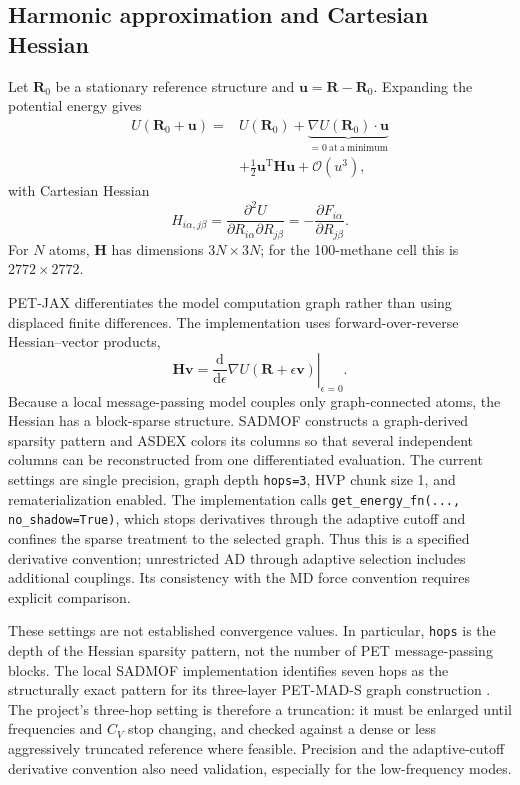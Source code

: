 \documentclass[10pt,a4paper,twocolumn]{article}
\newcommand{\cv}{\ensuremath{C_V}}
\begin{document}
\subsection{Harmonic approximation and Cartesian Hessian}

Let $\bm R_0$ be a stationary reference structure and
$\bm u=\bm R-\bm R_0$. Expanding the potential energy gives
\begin{equation}
  \begin{aligned}
  U(\bm R_0+\bm u)={}&U(\bm R_0)
  +\underbrace{\nabla U(\bm R_0)\cdot\bm u}
       _{=0\ \mathrm{at\ a\ minimum}}
  \\
  &+\frac{1}{2}\bm u^{\mathrm T}\bm H\bm u
  +\mathcal O(u^3),
  \end{aligned}
  \label{eq:taylor}
\end{equation}
with Cartesian Hessian
\begin{equation}
  H_{i\alpha,j\beta}
  =\frac{\partial^2 U}{\partial R_{i\alpha}\partial R_{j\beta}}
  =-\frac{\partial F_{i\alpha}}{\partial R_{j\beta}}.
  \label{eq:hessian}
\end{equation}
For $N$ atoms, $\bm H$ has dimensions $3N\times3N$; for the 100-methane cell
this is $2772\times2772$.

PET-JAX differentiates the model computation graph rather than using displaced
finite differences. The implementation uses forward-over-reverse
Hessian--vector products,
\begin{equation}
  \bm H\bm v=
  \left.\frac{\mathrm d}{\mathrm d\epsilon}
  \nabla U(\bm R+\epsilon\bm v)\right|_{\epsilon=0}.
\end{equation}
Because a local message-passing model couples only graph-connected atoms, the
Hessian has a block-sparse structure. SADMOF \cite{sadMof} constructs a
graph-derived sparsity pattern and ASDEX colors its columns so that several independent
columns can be reconstructed from one differentiated evaluation. The current
settings are single precision, graph depth \texttt{hops=3}, HVP chunk size 1,
and rematerialization enabled. The implementation calls
\texttt{get\_energy\_fn(..., no\_shadow=True)}, which stops derivatives
through the adaptive cutoff and confines the sparse treatment to the selected
graph. Thus this is a specified derivative convention; unrestricted AD
through adaptive selection includes additional couplings. Its consistency
with the MD force convention requires explicit comparison.

These settings are not established convergence values. In particular,
\texttt{hops} is the depth of the Hessian sparsity pattern, not the number of
PET message-passing blocks. The local SADMOF implementation identifies seven
hops as the structurally exact pattern for its three-layer PET-MAD-S graph
construction \cite{sadMof}. The project's three-hop setting is therefore a
truncation: it must be enlarged until frequencies and \cv{} stop changing,
and checked against a dense or less aggressively truncated reference where
feasible. Precision and the adaptive-cutoff derivative convention also need
validation, especially for the low-frequency modes.
\end{document}
